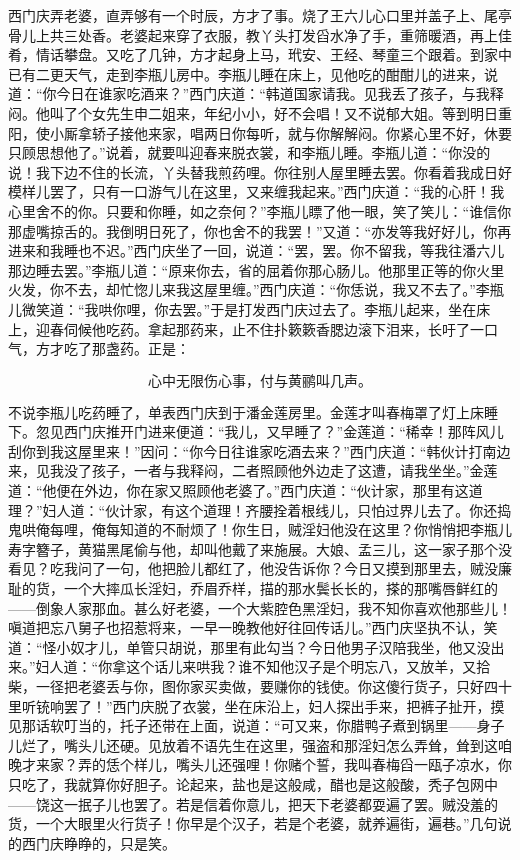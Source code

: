 西门庆弄老婆，直弄够有一个时辰，方才了事。烧了王六儿心口里并盖子上、尾亭骨儿上共三处香。老婆起来穿了衣服，教丫头打发舀水净了手，重筛暖酒，再上佳肴，情话攀盘。又吃了几钟，方才起身上马，玳安、王经、琴童三个跟着。到家中已有二更天气，走到李瓶儿房中。李瓶儿睡在床上，见他吃的酣酣儿的进来，说道：“你今日在谁家吃酒来？”西门庆道：“韩道国家请我。见我丢了孩子，与我释闷。他叫了个女先生申二姐来，年纪小小，好不会唱！又不说郁大姐。等到明日重阳，使小厮拿轿子接他来家，唱两日你每听，就与你解解闷。你紧心里不好，休要只顾思想他了。”说着，就要叫迎春来脱衣裳，和李瓶儿睡。李瓶儿道：“你没的说！我下边不住的长流，丫头替我煎药哩。你往别人屋里睡去罢。你看着我成日好模样儿罢了，只有一口游气儿在这里，又来缠我起来。”西门庆道：“我的心肝！我心里舍不的你。只要和你睡，如之奈何？”李瓶儿瞟了他一眼，笑了笑儿：“谁信你那虚嘴掠舌的。我倒明日死了，你也舍不的我罢！”又道：“亦发等我好好儿，你再进来和我睡也不迟。”西门庆坐了一回，说道：“罢，罢。你不留我，等我往潘六儿那边睡去罢。”李瓶儿道：“原来你去，省的屈着你那心肠儿。他那里正等的你火里火发，你不去，却忙惚儿来我这屋里缠。”西门庆道：“你恁说，我又不去了。”李瓶儿微笑道：“我哄你哩，你去罢。”于是打发西门庆过去了。李瓶儿起来，坐在床上，迎春伺候他吃药。拿起那药来，止不住扑簌簌香腮边滚下泪来，长吁了一口气，方才吃了那盏药。正是：

\[
心中无限伤心事，付与黄鹂叫几声。
\]

不说李瓶儿吃药睡了，单表西门庆到于潘金莲房里。金莲才叫春梅罩了灯上床睡下。忽见西门庆推开门进来便道：“我儿，又早睡了？”金莲道：“稀幸！那阵风儿刮你到我这屋里来！”因问：“你今日往谁家吃酒去来？”西门庆道：“韩伙计打南边来，见我没了孩子，一者与我释闷，二者照顾他外边走了这遭，请我坐坐。”金莲道：“他便在外边，你在家又照顾他老婆了。”西门庆道：“伙计家，那里有这道理？”妇人道：“伙计家，有这个道理！齐腰拴着根线儿，只怕过界儿去了。你还捣鬼哄俺每哩，俺每知道的不耐烦了！你生日，贼淫妇他没在这里？你悄悄把李瓶儿寿字簪子，黄猫黑尾偷与他，却叫他戴了来施展。大娘、孟三儿，这一家子那个没看见？吃我问了一句，他把脸儿都红了，他没告诉你？今日又摸到那里去，贼没廉耻的货，一个大摔瓜长淫妇，乔眉乔样，描的那水鬓长长的，搽的那嘴唇鲜红的——倒象人家那血。甚么好老婆，一个大紫腔色黑淫妇，我不知你喜欢他那些儿！嗔道把忘八舅子也招惹将来，一早一晚教他好往回传话儿。”西门庆坚执不认，笑道：“怪小奴才儿，单管只胡说，那里有此勾当？今日他男子汉陪我坐，他又没出来。”妇人道：“你拿这个话儿来哄我？谁不知他汉子是个明忘八，又放羊，又拾柴，一径把老婆丢与你，图你家买卖做，要赚你的钱使。你这傻行货子，只好四十里听铳响罢了！”西门庆脱了衣裳，坐在床沿上，妇人探出手来，把裤子扯开，摸见那话软叮当的，托子还带在上面，说道：“可又来，你腊鸭子煮到锅里——身子儿烂了，嘴头儿还硬。见放着不语先生在这里，强盗和那淫妇怎么弄耸，耸到这咱晚才来家？弄的恁个样儿，嘴头儿还强哩！你赌个誓，我叫春梅舀一瓯子凉水，你只吃了，我就算你好胆子。论起来，盐也是这般咸，醋也是这般酸，秃子包网中——饶这一抿子儿也罢了。若是信着你意儿，把天下老婆都耍遍了罢。贼没羞的货，一个大眼里火行货子！你早是个汉子，若是个老婆，就养遍街，遍巷。”几句说的西门庆睁睁的，只是笑。

